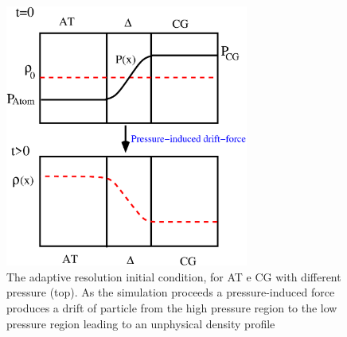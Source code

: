 \documentclass[aps,pre,preprint]{revtex4}
\begin{document}
\begin{figure}
  \centering
  \includegraphics[angle=0,width=8cm]{pressure2.eps}
  \caption{The adaptive resolution initial condition, for AT e CG with different pressure (top). As the simulation proceeds a pressure-induced force produces a drift of particle from the high pressure region to the low pressure region leading to an unphysical density profile}
  \label{figpress}
\end{figure} 
\end{document}
